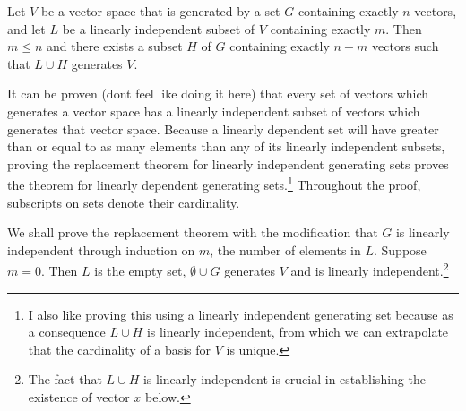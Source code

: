 \documentclass[nobib,notoc]{tufte-handout}
\begin{document}
\begin{thm}[Replacement]
	Let \(V\) be a vector space that is generated by a set \(G\) containing exactly \(n\) vectors, and let \(L\) be a linearly independent subset of \(V\) containing exactly \(m\). Then \(m\leq n\) and there exists a subset \(H\) of \(G\) containing exactly \(n-m\) vectors such that \(L\cup H\) generates \(V\).\medbreak
\begin{IEEEproof}
	It can be proven (dont feel like doing it here) that every set of vectors which generates a vector space has a linearly independent subset of vectors which generates that vector space. Because a linearly dependent set will have greater than or equal to as many elements than any of its linearly independent subsets, proving the replacement theorem for linearly independent generating sets proves the theorem for linearly dependent generating sets.\footnote{I also like proving this using a linearly independent generating set because as a consequence \(L\cup H\) is linearly independent, from which we can extrapolate that the cardinality of a basis for \(V\) is unique.} Throughout the proof, subscripts on sets denote their cardinality.\medbreak 

	We shall prove the replacement theorem with the modification that \(G\) is linearly independent through induction on \(m\), the number of elements in \(L\). Suppose \(m=0\). Then \(L\) is the empty set, \(\emptyset\cup G\) generates \(V\) and is linearly independent.\footnote{The fact that \(L\cup H\) is linearly independent is crucial in establishing the existence of vector \(x\) below.}


\end{IEEEproof}
\end{thm}
\end{document}
